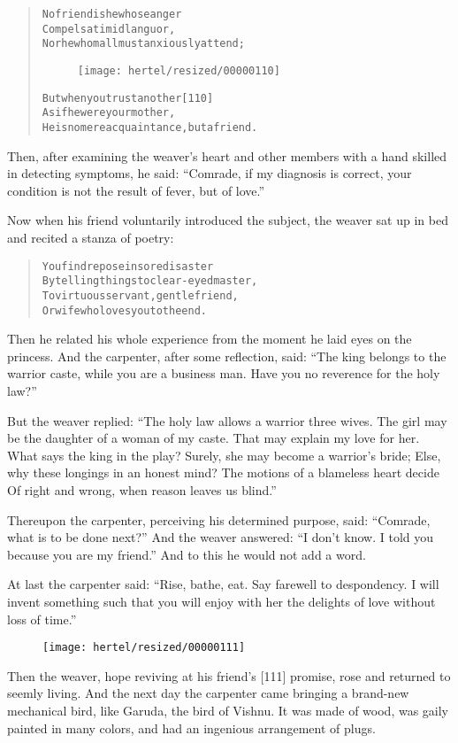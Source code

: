 \documentclass[article, twoside, 10pt]{memoir}
\renewenvironment{verbatim}{%
\begin{quote}%
\vskip -10pt%
\begin{alltt}\normalfont\small}{\end{alltt}%
\end{quote}%
\vskip -10pt
} %
\begin{document}
\begin{verbatim}
No friend is he whose anger
Compels a timid languor,
    Nor he whom all must anxiously attend;
\begin{figure}[p]\texttt{[image: hertel/resized/00000110]}\end{figure}But when you trust another                              [110]
As if he were your mother,
    He is no mere acquaintance, but a friend.
\end{verbatim}
Then, after examining the weaver's heart and other members with a
hand skilled in detecting symptoms, he said:
``Comrade, if my diagnosis is correct, your condition is not the result of fever, but of love.''

Now when his friend voluntarily introduced the subject, the weaver
sat up in bed and recited a stanza of poetry:

\begin{verbatim}
You find repose in sore disaster
By telling things to clear-eyed master,
To virtuous servant, gentle friend,
Or wife who loves you to the end.
\end{verbatim}
Then he related his whole experience from the moment he laid eyes
on the princess. And the carpenter, after some reflection, said:
``The king belongs to the warrior caste, while you are a business man. Have you no reverence for the holy law?''

But the weaver replied:
``The holy law allows a warrior three wives. The girl may be the daughter of a woman of my caste. That may explain my love for her. What says the king in the play? Surely, she may become a warrior's bride; Else, why these longings in an honest mind? The motions of a blameless heart decide Of right and wrong, when reason leaves us blind.''

Thereupon the carpenter, perceiving his determined purpose, said:
``Comrade, what is to be done next?'' And the weaver answered:
``I don't know. I told you because you are my friend.'' And to this
he would not add a word.

At last the carpenter said:
``Rise, bathe, eat. Say farewell to despondency. I will invent something such that you will enjoy with her the delights of love without loss of time.''

\begin{figure}[p]\texttt{[image: hertel/resized/00000111]}\end{figure}Then the weaver, hope reviving at his friend's [111] promise, rose
and returned to seemly living. And the next day the carpenter came
bringing a brand-new mechanical bird, like Garuda, the bird of
Vishnu. It was made of wood, was gaily painted in many colors, and
had an ingenious arrangement of plugs.
\end{document}
